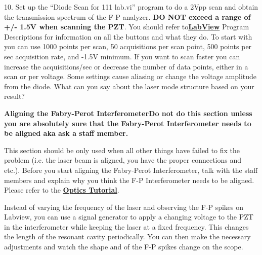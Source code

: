 \documentclass{../lab}
\begin{document}
10. Set up the ``Diode Scan for 111 lab.vi'' program to do a 2Vpp scan and obtain the transmission spectrum of the F-P analyzer. \textbf{DO NOT exceed a range of +/- 1.5V when scanning the PZT}. You should refer to\href{http://dev-physicsadv.pantheon.berkeley.edu/node/119}{\textbf{}}\href{http://dev-physicsadv.pantheon.berkeley.edu/node/119}{\textbf{LabView}} Program Descriptions for information on all the buttons and what they do. To start with you can use 1000 points per scan, 50 acquisitions per scan point, 500 points per sec acquisition rate, and -1.5V minimum. If you want to scan faster you can increase the acquisitions/sec or decrease the number of data points, either in a scan or per voltage. Some settings cause aliasing or change the voltage amplitude from the diode. What can you say about the laser mode structure based on your result?

\textbf{Aligning the Fabry-Perot Interferometer}\textbf{Do not do this section unless you are absolutely sure that the Fabry-Perot Interferometer needs to be aligned aka ask a staff member.}

This section should be only used when all other things have failed to fix the problem (i.e. the laser beam is aligned, you have the proper connections and etc.). Before you start aligning the Fabry-Perot Interferometer, talk with the staff members and explain why you think the F-P Interferometer needs to be aligned. Please refer to the \href{http://experimentationlab.berkeley.edu/OpticsTutorial}{\textbf{Optics Tutorial}}.

Instead of varying the frequency of the laser and observing the F-P spikes on Labview, you can use a signal generator to apply a changing voltage to the PZT in the interferometer while keeping the laser at a fixed frequency. This changes the length of the resonant cavity periodically. You can then make the necessary adjustments and watch the shape and of the F-P spikes change on the scope.
\end{document}
